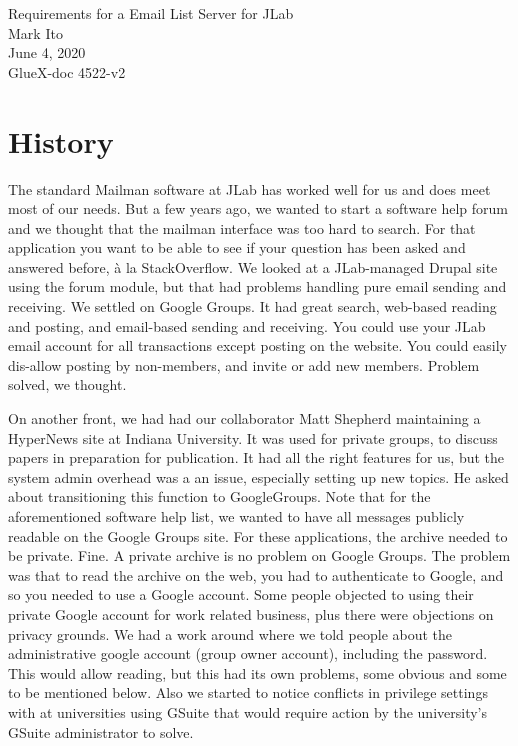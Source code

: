 \documentclass{article}
\begin{document}
\begin{center}
  {\Large Requirements for a Email List Server for JLab} \\
  \medskip
  {\large Mark Ito \\
    June 4, 2020} \\
  GlueX-doc 4522-v2
\end{center}

\section{History}

The standard Mailman software at JLab has worked well for us and does
meet most of our needs. But a few years ago, we wanted to start a
software help forum and we thought that the mailman interface was too
hard to search. For that application you want to be able to see if
your question has been asked and answered before, \` a la StackOverflow. We looked at a
JLab-managed Drupal site using the forum module, but that had problems
handling pure email sending and receiving. We settled on Google
Groups. It had great search, web-based reading and posting, and
email-based sending and receiving. You could use your JLab email
account for all transactions except posting on the website. You could
easily dis-allow posting by non-members, and invite or add new
members. Problem solved, we thought.

On another front, we had had our collaborator Matt Shepherd
maintaining a HyperNews site at Indiana University. It was used for
private groups, to discuss papers in preparation for publication. It
had all the right features for us, but the system admin overhead was a
an issue, especially setting up new topics. He asked about
transitioning this function to GoogleGroups. Note that for the
aforementioned software help list, we wanted to have all messages
publicly readable on the Google Groups site. For these applications,
the archive needed to be private. Fine. A private archive is no
problem on Google Groups. The problem was that to read the archive on
the web, you had to authenticate to Google, and so you needed to use a
Google account. Some people objected to using their private Google
account for work related business, plus there were objections on
privacy grounds. We had a work around where we told people about the
administrative google account (group owner account), including the
password. This would allow reading, but this had its own problems,
some obvious and some to be mentioned below. Also we started to notice
conflicts in privilege settings with at universities using GSuite that
would require action by the university's GSuite administrator to
solve.
\end{document}
